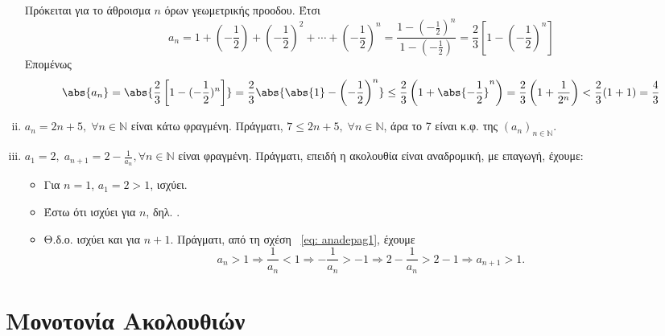 \documentclass[main.tex]{subfiles}
\begin{document}
\begin{examples}
\begin{enumerate}[i)]
            Πρόκειται για το άθροισμα $ n $ όρων γεωμετρικής προοδου. Έτσι
            \[ a_{n} = 1 + \left(- \frac{1}{2}\right) + \left(- \frac{1}{2} 
                \right)^{2} + \cdots + \left(- \frac{1}{2} \right)^{n} = 
                \frac{1 - (- \frac{1}{2} )^{n}}{1 - (- \frac{1}{2})} = 
            \frac{2}{3} \left[1 - \left(- \frac{1}{2} \right)^{n}\right] \]
            Επομένως
            \[
                \abs{a_{n}} = \abs{\frac{2}{3} \left[1-(- \frac{1}{2} )^{n}
                        \right]} = \frac{2}{3} \abs{\abs{1} - \left(- 
                \frac{1}{2}\right)^{n}} \leq 
                \frac{2}{3} \left(1 + \abs{-\frac{1}{2} }^{n} \right) = 
                \frac{2}{3} \left(1+ \frac{1}{2^{n}}\right) < \frac{2}{3}
                (1+1) = \frac{4}{3} 
            \] 

        \item $ a_{n}= 2n+5, \; \forall n \in \mathbb{N} $ είναι κάτω 
            φραγμένη.
            Πράγματι, $ 7 \leq 2n+5, \; \forall n \in \mathbb{N} $, άρα το 
            7 είναι κ.φ. της $ (a_{n} )_{n \in \mathbb{N}} $.

        \item $ a_{1}=2, \; a_{n+1}=2 - \frac{1}{a_{n}}, \forall n \in 
            \mathbb{N}$
            είναι φραγμένη. Πράγματι, επειδή η ακολουθία είναι αναδρομική, 
            με επαγωγή, έχουμε:
            \begin{itemize}
                \item Για $ n=1 $, $ a_{1}=2>1 $, ισχύει. 
                \item Έστω ότι ισχύει για $n$, δηλ. .
                \item Θ.δ.ο. ισχύει και για $ n+1 $. Πράγματι, από τη σχέση~
                    \eqref{eq: anadepag1}, έχουμε
                    \[
                        a_{n}>1 \Rightarrow \frac{1}{a_{n}} 
                        < 1 \Rightarrow - \frac{1}{a_{n}} > 
                        -1 \Rightarrow 2 - \frac{1}{a_{n}} 
                        > 2-1 \Rightarrow a_{n+1} > 1.
                    \] 
            \end{itemize}
    \end{enumerate}
\end{examples}

\section{Μονοτονία Ακολουθιών}
\end{document}
